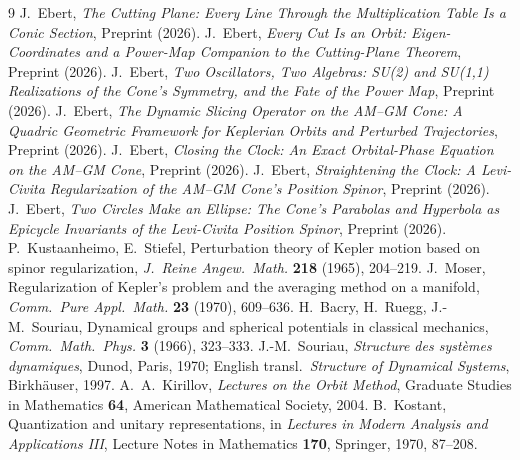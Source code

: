 \documentclass[11pt]{amsart}
\theoremstyle{remark}
\begin{document}
\begin{thebibliography}{9}
 J.~Ebert, \emph{The Cutting Plane: Every Line Through the Multiplication Table Is a Conic Section}, Preprint (2026).
 J.~Ebert, \emph{Every Cut Is an Orbit: Eigen-Coordinates and a Power-Map Companion to the Cutting-Plane Theorem}, Preprint (2026).
 J.~Ebert, \emph{Two Oscillators, Two Algebras: SU(2) and SU(1,1) Realizations of the Cone's Symmetry, and the Fate of the Power Map}, Preprint (2026).
 J.~Ebert, \emph{The Dynamic Slicing Operator on the AM--GM Cone: A Quadric Geometric Framework for Keplerian Orbits and Perturbed Trajectories}, Preprint (2026).
 J.~Ebert, \emph{Closing the Clock: An Exact Orbital-Phase Equation on the AM--GM Cone}, Preprint (2026).
 J.~Ebert, \emph{Straightening the Clock: A Levi-Civita Regularization of the AM--GM Cone's Position Spinor}, Preprint (2026).
 J.~Ebert, \emph{Two Circles Make an Ellipse: The Cone's Parabolas and Hyperbola as Epicycle Invariants of the Levi-Civita Position Spinor}, Preprint (2026).
 P.~Kustaanheimo, E.~Stiefel, Perturbation theory of Kepler motion based on spinor regularization, \emph{J.\ Reine Angew.\ Math.} \textbf{218} (1965), 204--219.
 J.~Moser, Regularization of Kepler's problem and the averaging method on a manifold, \emph{Comm.\ Pure Appl.\ Math.} \textbf{23} (1970), 609--636.
 H.~Bacry, H.~Ruegg, J.-M.~Souriau, Dynamical groups and spherical potentials in classical mechanics, \emph{Comm.\ Math.\ Phys.} \textbf{3} (1966), 323--333.
 J.-M.~Souriau, \emph{Structure des syst\`emes dynamiques}, Dunod, Paris, 1970; English transl.\ \emph{Structure of Dynamical Systems}, Birkh\"auser, 1997.
 A.~A.~Kirillov, \emph{Lectures on the Orbit Method}, Graduate Studies in Mathematics \textbf{64}, American Mathematical Society, 2004.
 B.~Kostant, Quantization and unitary representations, in \emph{Lectures in Modern Analysis and Applications III}, Lecture Notes in Mathematics \textbf{170}, Springer, 1970, 87--208.
\end{thebibliography}
\end{document}
